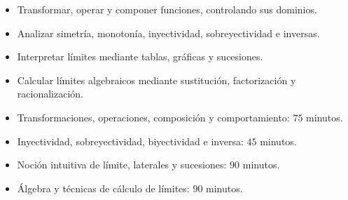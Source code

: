\def\documentoSemanal{}
\usepackage{tikz}
\usepackage{estilo_apuntes}
\usetikzlibrary{arrows.meta,positioning,babel}




\begin{objetivos}
\begin{itemize}
  \item Transformar, operar y componer funciones, controlando sus dominios.
  \item Analizar simetría, monotonía, inyectividad, sobreyectividad e inversas.
  \item Interpretar límites mediante tablas, gráficas y sucesiones.
  \item Calcular límites algebraicos mediante sustitución, factorización y racionalización.
\end{itemize}
\end{objetivos}


\ifmostrarSoluciones
\begin{docente}
\begin{itemize}
  \item Transformaciones, operaciones, composición y comportamiento: $75$ minutos.
  \item Inyectividad, sobreyectividad, biyectividad e inversa: $45$ minutos.
  \item Noción intuitiva de límite, laterales y sucesiones: $90$ minutos.
  \item Álgebra y técnicas de cálculo de límites: $90$ minutos.
\end{itemize}
\end{docente}
\fi








